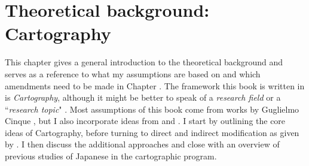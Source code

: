 \chapter{Theoretical background: Cartography} \label{theoretical background}

This chapter gives a general introduction to the theoretical background and serves as a reference to what my assumptions are based on and which amendments need to be made in Chapter . The framework this book is written in is \textit{Cartography}, although it might be better to speak of a \textit{research field} or a ``\textit{research topic}" \citep[65]{cinriz:2010:carto}. Most assumptions of this book come from works by Guglielmo Cinque \citep{cinque:1993:evidence, cinque:2010:adj, cinque:2017:micro, cinque:2020:relcl, cinque:2021:carto, cinque:2023:linearization}, but I also incorporate ideas from \citet{laenzlinger:2005:french, laenzlinger:2011:elements, laenzlinger:2015:the, svenonius:2008:position} and \citet{kim:2019:syntax}. I start by outlining the core ideas of Cartography, before turning to direct and indirect modification as given by \citet{cinque:2010:adj}. I then discuss the additional approaches and close with an overview of previous studies of Japanese in the cartographic program.

